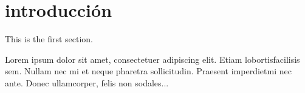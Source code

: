 \section*{introducción}
 
This is the first section.
 
Lorem  ipsum  dolor  sit  amet,  consectetuer  adipiscing  
elit.   Etiam  lobortisfacilisis sem.  Nullam nec mi et 
neque pharetra sollicitudin.  Praesent imperdietmi nec ante. 
Donec ullamcorper, felis non sodales...
